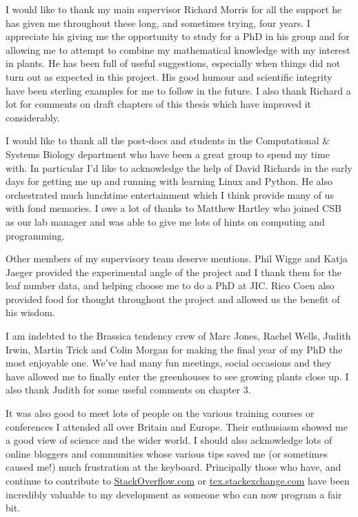 I would like to thank my main supervisor Richard Morris for all the support he has given me throughout these long, and sometimes trying, four years.
I appreciate his giving me the opportunity to study for a PhD in his group and for allowing me to attempt to combine my mathematical knowledge with my interest in plants.
He has been full of useful suggestions, especially when things did not turn out as expected in this project.
His good humour and scientific integrity have been sterling examples for me to follow in the future.
I also thank Richard a lot for comments on draft chapters of this thesis which have improved it considerably.

I would like to thank all the post-docs and students in the Computational \& Systems Biology department who have been a great group to spend my time with.
In particular I'd like to acknowledge the help of David Richards in the early days for getting me up and running with learning Linux and Python.
He also orchestrated much lunchtime entertainment which I think provide many of us with fond memories.
I owe a lot of thanks to Matthew Hartley who joined CSB as our lab manager and was able to give me lots of hints on computing and programming.

Other members of my supervisory team deserve mentions.
Phil Wigge and Katja Jaeger provided the experimental angle of the project and I thank them for the leaf number data, and helping choose me to do a PhD at JIC\@.
Rico Coen also provided food for thought throughout the project and allowed us the benefit of his wisdom.

I am indebted to the Brassica tendency crew of Marc Jones, Rachel Wells, Judith Irwin, Martin Trick and Colin Morgan for making the final year of my PhD the most enjoyable one.
We've had many fun meetings, social occasions and they have allowed me to finally enter the greenhouses to see growing plants close up.
I also thank Judith for some useful comments on chapter 3.

It was also good to meet lots of people on the various training courses or conferences I attended all over Britain and Europe.
Their enthusiasm showed me a good view of science and the wider world.
I should also acknowledge lots of online bloggers and communities whose various tips saved me (or sometimes caused me!) much frustration at the keyboard.
Principally those who have, and continue to contribute to \url{StackOverflow.com} or \url{tex.stackexchange.com} have been incredibly valuable to my development as someone who can now program a fair bit.

